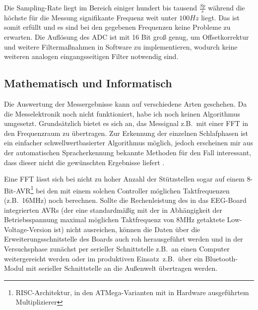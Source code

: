 \documentclass[12pt,a4paper,notitlepage]{article}
\begin{document}
Die \gls{Sampling}-Rate liegt im Bereich einiger hundert bis tausend $\frac{Sp}{s}$ während die höchste für die Messung signifikante Frequenz weit unter $100Hz$ liegt. Das  ist somit erfüllt und es sind bei den gegebenen Frequenzen keine Probleme zu erwarten.
Die Auflösung des \gls{ADC} ist mit 16 Bit groß genug, um \gls{Offsetkorrektur} und weitere Filtermaßnahmen in Software zu implementieren, wodurch keine weiteren analogen eingangsseitigen Filter notwendig sind.

\subsection{Mathematisch und Informatisch}
Die Auswertung der Messergebnisse kann auf verschiedene Arten geschehen. Da die Messelektronik noch nicht funktioniert, habe ich noch keinen Algorithmus umgesetzt.
Grundsätzlich bietet es sich an, das Messignal z.B.\ mit einer \gls{FFT} in den Frequenzraum zu übertragen. Zur Erkennung der einzelnen Schlafphasen ist ein einfacher schwellwertbasierter Algorithmus möglich, jedoch erscheinen mir aus der automatischen Spracherkennung bekannte Methoden für den Fall interessant, dass dieser nicht die gewünschten Ergebnisse liefert
\cite{WP2,WP11,WP12,WP13}.

Eine FFT lässt sich bei nicht zu hoher Anzahl der Stützstellen sogar auf einem 8-Bit-AVR\footnote{RISC-Architektur, in den \glqq ATMega\grqq-Varianten mit in Hardware ausgeführtem Multiplizierer} bei den mit einem solchen Controller möglichen Taktfrequenzen (z.B.\ 16MHz) noch berechnen\cite{LOMBARD1}. Sollte die Rechenleistung des in das EEG-Board integrierten AVRs (der eine standardmäßig mit der in Abhängigkeit der Betriebsspannung maximal möglichen Taktfrequenz von 8MHz getaktete Low-Voltage-Version ist) nicht ausreichen, können die Daten über die Erweiterungsschnitstelle des Boards auch roh herausgeführt werden und in der Versuchsphase zunächst per serieller Schnittstelle z.B.\ an einen Computer weitergereicht werden oder im \glqq produktiven Einsatz\grqq\ z.B.\ über ein Bluetooth-Modul mit serieller Schnittstelle an die Außenwelt übertragen werden.
\end{document}
